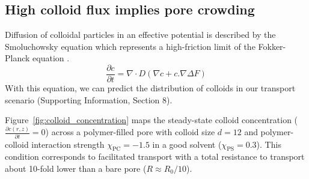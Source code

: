 \documentclass[12pt, a4paper]{article}
\begin{document}
\subsection{High colloid flux implies pore crowding}

Diffusion of colloidal particles in an effective potential is described by the Smoluchowsky equation which represents a high-friction limit of the Fokker-Planck equation \cite{Risken1996}.
\begin{equation}
    \label{eq:Smoluchowski}
    \frac{\partial c}{\partial t} = \nabla \cdot D(\nabla c + c.\nabla \Delta F)
\end{equation}
With this equation, we can predict the distribution of colloids in our transport scenario (Supporting Information, Section 8). 

Figure~\ref{fig:colloid_concentration} maps the steady-state colloid concentration ($\frac{\partial c(r,z)}{\partial t} = 0$) across a polymer-filled pore with colloid size $d = 12$ and polymer-colloid interaction strength $\chi_{\text{PC}} = -1.5$ in a good solvent ($\chi_{\text{PS}} = 0.3$).
This condition corresponds to facilitated transport with a total resistance to transport about 10-fold lower than a bare pore ($R \approx R_0/10$).
\end{document}
